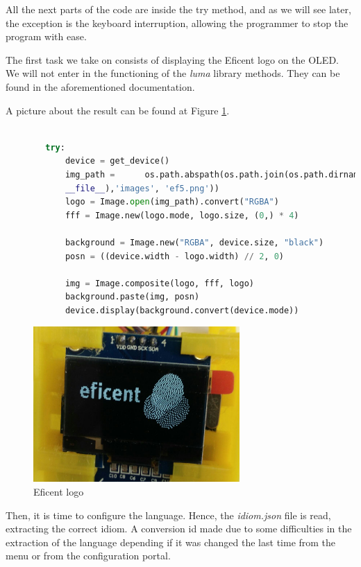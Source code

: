 \documentclass[12pt,a4paper,oneside]{article} %
\begin{document}
All the next parts of the code are inside the try method, and as we will see later, the exception is the keyboard interruption, allowing the programmer to stop the program with ease.

The first task we take on consists of displaying the Eficent logo on the OLED. We will not enter in the functioning of the \textit{luma} library methods. They can be found in the aforementioned documentation.

A picture about the result can be found at Figure \ref{ef-logo}.

\begin{lstlisting}[language=python]

		try:
	        device = get_device()
	        img_path = 		os.path.abspath(os.path.join(os.path.dirname(
	        __file__),'images', 'ef5.png'))
	        logo = Image.open(img_path).convert("RGBA")
	        fff = Image.new(logo.mode, logo.size, (0,) * 4)
	
	        background = Image.new("RGBA", device.size, "black")
	        posn = ((device.width - logo.width) // 2, 0)
	
	        img = Image.composite(logo, fff, logo)
	        background.paste(img, posn)
	        device.display(background.convert(device.mode))

\end{lstlisting}

\begin{figure}[h]
	\centering
	\includegraphics[width=0.7\textwidth]{images/eficent_msg.png}
	\caption[Eficent logo]{Eficent logo}
	\label{ef-logo}
\end{figure}

Then, it is time to configure the language. Hence, the \emph{idiom.json} file is read, extracting the correct idiom. A conversion id made due to some difficulties in the extraction of the language depending if it was changed the last time from the menu or from the configuration portal.
\end{document}
